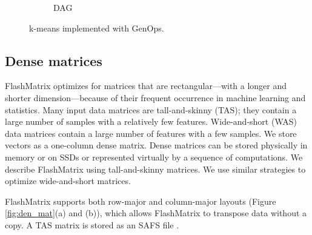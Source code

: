 \begin{figure}
\begin{subfigure}{.25\textwidth}
	\label{fig:dag}
	\caption{DAG}
	\end{subfigure}
  \vspace{-12pt}
	\caption{k-means implemented with GenOps.}
	\label{fig:kmeans}
  \vspace{-8pt}
\end{figure}

\vspace{-8pt}
\subsection{Dense matrices}
\vspace{-4pt}
FlashMatrix optimizes for matrices that are rectangular---with a longer and shorter 
dimension---because
of their frequent occurrence in machine learning and statistics.
Many input data matrices are tall-and-skinny (TAS); they contain
a large number of samples with a relatively few features.
Wide-and-short (WAS) data matrices contain a large number of features with
a few samples. 
We store vectors as a one-column dense matrix.
Dense matrices can be stored physically in memory or on SSDs or represented
virtually by a sequence of computations.
We describe FlashMatrix using tall-and-skinny matrices.  We use similar strategies to
optimize wide-and-short matrices.



FlashMatrix supports both row-major and column-major
layouts (Figure \ref{fig:den_mat}(a) and (b)), which allows 
FlashMatrix to transpose data without a copy.
A TAS matrix is stored as an SAFS file \cite{safs}.

